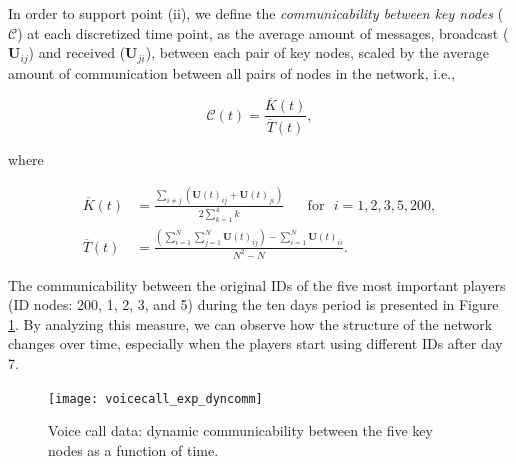 In order to support point (ii), we define the \textit{communicability between key nodes} ($\mathcal{C}$) at each discretized time point, as the average amount of messages, broadcast ($\mathbf{U}_{ij}$) and received ($\mathbf{U}_{ji}$), between each pair of key nodes, scaled by the average amount of communication between all pairs of nodes in the network, i.e.,

\begin{equation*}
    \mathcal{C}(t) = \frac{\overline{K}(t)}{\overline{T}(t)},
\end{equation*}

where

\begin{align*}
    \overline{K}(t) &=\frac{\sum_{i\ne j}\left(\mathbf{U}(t)_{ij} + \mathbf{U}(t)_{ji}\right)}{2\sum_{k=1}^4 k} \text{~~~~~for~~} i=1,2,3,5,200 ,\\
    \overline{T}(t) &=\frac{\left(\sum_{i=1}^{N}\sum_{j=1}^{N} \mathbf{U}(t)_{ij}\right) - \sum_{i=1}^N \mathbf{U}(t)_{ii}}{N^2-N}.
\end{align*}

The communicability between the original IDs of the five most important players (ID nodes: 200, 1, 2, 3, and 5) during the ten days period is presented in Figure \ref{fig:ve2}. By analyzing this measure, we can observe how the structure of the network changes over time, especially when the players start using different IDs after day 7.

\begin{figure}[h]\centering
    \texttt{[image: voicecall\_exp\_dyncomm]}
    \caption{Voice call data: dynamic communicability between the five key nodes as a function of time.}
    \label{fig:ve2}
    \bigskip
\end{figure}